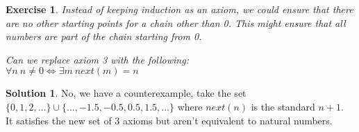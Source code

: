 \documentclass[a4paper,10pt]{article}
\newtheorem{exercise}{Exercise}[section]
\theoremstyle{definition} %
\newtheorem*{solution}{Solution}
\begin{document}
    \begin{exercise}
        Instead of keeping induction as an axiom, we could ensure that there are no other
        starting points for a chain other than 0. This might ensure that all numbers are
        part of the chain starting from 0. 

        Can we replace axiom 3 with the following: \\ 
        $\forall n \ n \neq 0 \iff \exists m \ next(m) = n$
    \end{exercise}
    \begin{solution}
        No, we have a counterexample, take the set \\ 
        $\{0, 1, 2, \dots\} \cup \{\dots, -1.5, -0.5, 0.5, 1.5, \dots\}$ where $next(n)$ is the standard $n+1$. \\
        It satisfies the new set of 3 axioms but aren't equivalent to natural numbers.
    \end{solution}
\end{document}
